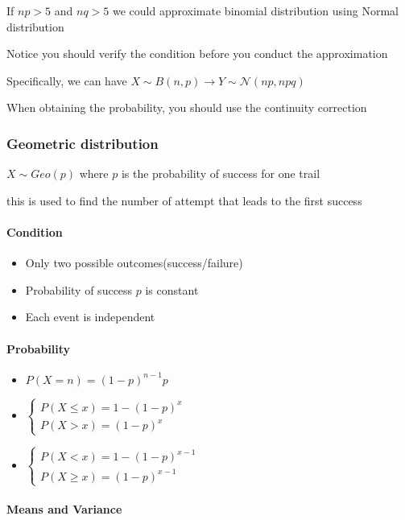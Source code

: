 \documentclass[]{article}
\let\oldparagraph\paragraph
\renewcommand{\paragraph}[1]{\oldparagraph{#1}\mbox{}}
\begin{document}
If \(np>5\) and \(nq > 5\) we could approximate binomial distribution
using Normal distribution

Notice you should verify the condition before you conduct the
approximation

Specifically, we can have
\(X \sim B(n,p) \rightarrow Y \sim \mathcal{N}(np, npq)\)

When obtaining the probability, you should use the continuity correction

\subsubsection{Geometric distribution}\label{header-n107}

\(X \sim Geo(p)\) where \(p\) is the probability of success for one
trail

this is used to find the number of attempt that leads to the first
success

\paragraph{Condition}\label{header-n110}

\begin{itemize}
\item
  Only two possible outcomes(success/failure)
\item
  Probability of success \(p\) is constant
\item
  Each event is independent
\end{itemize}

\paragraph{Probability}\label{header-n118}

\begin{itemize}
\item
  \(P(X = n) = (1-p)^{n-1}p\)
\item
  \(\begin{cases}P(X \le x) = 1-(1-p)^x \\ P(X > x) = (1-p)^x\end{cases}\)
\item
  \(\begin{cases}P(X < x) = 1-(1-p)^{x-1} \\ P(X \ge x) = (1-p)^{x-1}\end{cases}\)
\end{itemize}

\paragraph{Means and Variance}\label{header-n126}
\end{document}
